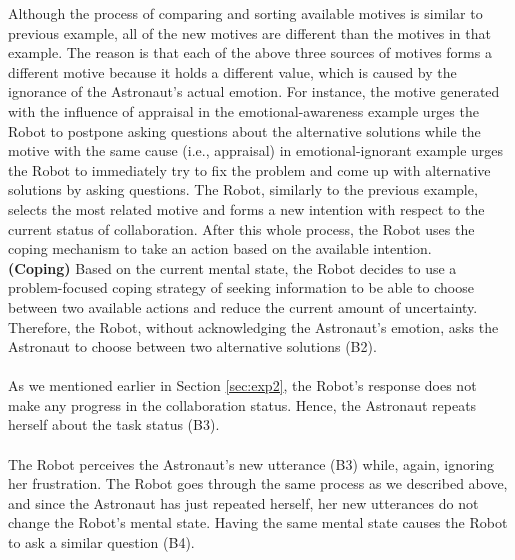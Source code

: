 Although the process of comparing and sorting available motives is similar to
previous example, all of the new motives are different than the motives in that
example. The reason is that each of the above three sources of motives forms a
different motive because it holds a different value, which is caused by the
ignorance of the Astronaut's actual emotion. For instance, the motive generated
with the influence of appraisal in the emotional-awareness example urges the
Robot to postpone asking questions about the alternative solutions while the
motive with the same cause (i.e., appraisal) in emotional-ignorant example
urges the Robot to immediately try to fix the problem and come up with
alternative solutions by asking questions. The Robot, similarly to the previous
example, selects the most related motive and forms a new intention with respect
to the current status of collaboration. After this whole process, the Robot uses
the coping mechanism to take an action based on the available intention.\\

\noindent\textbf{(Coping)} Based on the current mental state, the Robot decides
to use a problem-focused coping strategy of seeking information to be able to
choose between two available actions and reduce the current amount of
uncertainty. Therefore, the Robot, without acknowledging the Astronaut's
emotion, asks the Astronaut to choose between two alternative solutions (B2).\\

\noindent{}\\

As we mentioned earlier in Section \ref{sec:exp2}, the Robot's response does not
make any progress in the collaboration status. Hence, the Astronaut repeats
herself about the task status (B3).\\

\noindent{}\\

The Robot perceives the Astronaut's new utterance (B3) while, again, ignoring
her frustration. The Robot goes through the same process as we described above,
and since the Astronaut has just repeated herself, her new utterances do not
change the Robot's mental state. Having the same mental state causes the Robot
to ask a similar question (B4).\\

